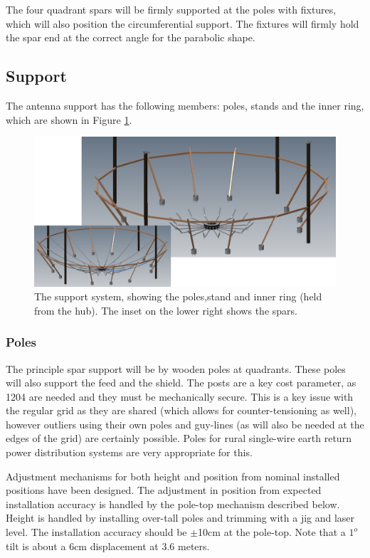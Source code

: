 \documentclass[11pt]{article}
\begin{document}
The four quadrant spars will be firmly supported at the poles with fixtures, which will also position the circumferential support.  The fixtures will firmly hold the spar end at the correct angle for the parabolic shape.  

\subsection{Support}
The antenna support has the following members:  poles, stands and the inner ring, which are shown in Figure \ref{fig:support}.

\begin{figure}[H]
\centering
\includegraphics[width=\textwidth]{plots/support.png}
\caption{The support system, showing the poles,stand and inner ring (held from the hub).  The inset on the lower right shows the spars.}
\label{fig:support}
\end{figure}

\subsubsection{Poles}
The principle spar support will be by wooden poles at quadrants.  These poles will also support the feed and the shield.  The posts are a key cost parameter, as 1204 are needed and they must be mechanically secure.  This is a key issue with the regular grid as they are shared (which allows for counter-tensioning as well), however outliers using their own poles and guy-lines (as will also be needed at the edges of the grid) are certainly possible.   Poles for rural single-wire earth return power distribution systems are very appropriate for this.

Adjustment mechanisms for both height and position from nominal installed positions have been designed.  The adjustment in position from expected installation accuracy is handled by the pole-top mechanism described below.  Height is handled by installing over-tall poles and trimming with a jig and laser level.  The installation accuracy should be $\pm$10cm at the pole-top.  Note that a $1^o$ tilt is about a 6cm displacement at 3.6 meters.
\end{document}
